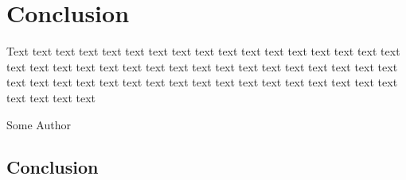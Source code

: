 \chapter{Conclusion}
\label{chap:conclusion}

\epigraph{Text text text text text text text text text text text text
  text text text text text text text text text text text text text
  text text text text text text text text text text text text text
  text text text text text text text text text text text text text
  text text text text}{Some Author}
\clearpage

\section{Conclusion}
